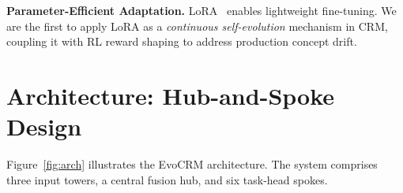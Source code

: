 \documentclass[10pt,twocolumn]{article}
\begin{document}
\textbf{Parameter-Efficient Adaptation.} LoRA~\cite{hu2022lora} enables lightweight fine-tuning. We are the first to apply LoRA as a \emph{continuous self-evolution} mechanism in CRM, coupling it with RL reward shaping to address production concept drift.

\section{Architecture: Hub-and-Spoke Design}
\enlargethispage{1.5\baselineskip}

Figure~\ref{fig:arch} illustrates the EvoCRM architecture. The system comprises three input towers, a central fusion hub, and six task-head spokes.
\end{document}
